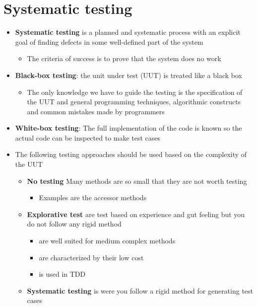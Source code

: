 \documentclass[11pt]{article}
\providecommand{\tightlist}{%
      \setlength{\itemsep}{0pt}\setlength{\parskip}{0pt}}
\begin{document}
    \hypertarget{systematic-testing}{%
\section{Systematic testing}\label{systematic-testing}}

\begin{itemize}
\tightlist
\item
  \textbf{Systematic testing} is a planned and systematic process with
  an explicit goal of finding defects in some well-defined part of the
  system

  \begin{itemize}
  \tightlist
  \item
    The criteria of success is to prove that the system does no work
  \end{itemize}
\item
  \textbf{Black-box testing}: the unit under test (UUT) is treated like
  a black box

  \begin{itemize}
  \tightlist
  \item
    The only knowledge we have to guide the testing is the specification
    of the UUT and general programming techniques, algorithmic
    constructs and common mistakes made by programmers
  \end{itemize}
\item
  \textbf{White-box testing}: The full implementation of the code is
  known so the actual code can be inspected to make test cases
\item
  The following testing approaches should be used based on the
  complexity of the UUT

  \begin{itemize}
  \tightlist
  \item
    \textbf{No testing} Many methods are so small that they are not
    worth testing

    \begin{itemize}
    \tightlist
    \item
      Examples are the accessor methods
    \end{itemize}
  \item
    \textbf{Explorative test} are test based on experience and gut
    feeling but you do not follow any rigid method

    \begin{itemize}
    \tightlist
    \item
      are well suited for medium complex methods
    \item
      are characterized by their low cost
    \item
      is used in TDD
    \end{itemize}
  \item
    \textbf{Systematic testing} is were you follow a rigid method for
    generating test cases


\end{itemize}
\end{itemize}
\end{document}
